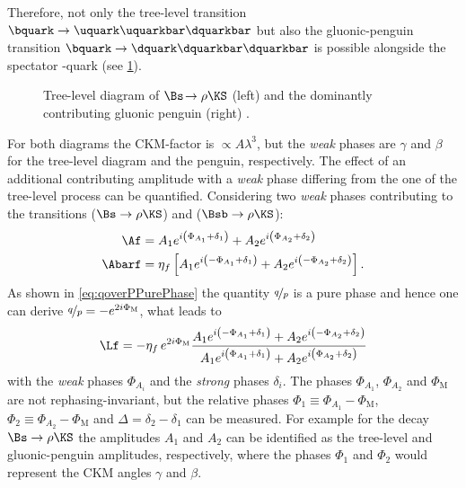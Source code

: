 Therefore, not only the tree-level transition $\bquark\to\uquark\uquarkbar\dquarkbar$ but also the gluonic-penguin transition $\bquark\to\dquark\dquarkbar\dquarkbar$ is possible alongside the spectator \squark-quark (see \cref{fig:Bs2RhoKS}).
\begin{figure}[tbp]
	\centering
	
	
	\caption{Tree-level diagram of $\Bs\!\to\rho\KS$ (left) and the dominantly contributing gluonic penguin (right) \cite{Ellis:2016jkw}.}
	\label{fig:Bs2RhoKS}
\end{figure}
For both diagrams the CKM-factor is $\propto A\lambda^3$, but the \emph{weak} phases are $\gamma$ and $\beta$ for the tree-level diagram and the penguin, respectively.
The effect of an additional contributing amplitude with a \emph{weak} phase differing from the one of the tree-level process can be quantified.
Considering two \emph{weak} phases contributing to the transitions \Af ($\Bs\to\rho\KS$) and \Abarf ($\Bsb\to\rho\KS$):
\begin{equation}
\begin{aligned}
\Af&=A_1e^{i\left(\Phi_{A_1}+\delta_1\right)}+A_2e^{i\left(\Phi_{A_2}+\delta_2\right)}\\
\Abarf&=\eta_f\left[A_1e^{i\left(-\Phi_{A_1}+\delta_1\right)}+A_2e^{i\left(-\Phi_{A_2}+\delta_2\right)}\right].
\end{aligned}
\end{equation}
As shown in \cref{eq:qoverPPurePhase} the quantity $\nicefrac{q}{p}$ is a pure phase and hence one can derive $\nicefrac{q}{p}=-e^{2i\Phi_\text{M}}$, what leads to
\begin{equation}
\Lf=-\eta_f\,e^{2i\Phi_\text{M}}\frac{ A_1 e^{i\left(-\Phi_{A_1}+\delta_1\right)} + A_2 e^{i\left(-\Phi_{A_2}+\delta_2\right)}}{A_1e^{i\left(\Phi_{A_1}+\delta_1\right)}+A_2e^{i\left(\Phi_{A_2}+\delta_2\right)}} \label{eq:LfWithPenguin}
\end{equation}
with the \emph{weak} phases $\Phi_{A_i}$ and the \emph{strong} phases $\delta_i$.
The phases $\Phi_{A_1}$, $\Phi_{A_2}$ and $\Phi_\text{M}$ are not rephasing-invariant, but the relative phases $\Phi_1\equiv\Phi_{A_1}-\Phi_\text{M}$, $\Phi_2\equiv\Phi_{A_2}-\Phi_\text{M}$ and $\Delta=\delta_2-\delta_1$ can be measured.
For example for the decay $\Bs\to\rho\KS$ the amplitudes $A_1$ and $A_2$ can be identified as the tree-level and gluonic-penguin amplitudes, respectively, where the phases $\Phi_1$ and $\Phi_2$ would represent the CKM angles $\gamma$ and $\beta$.
